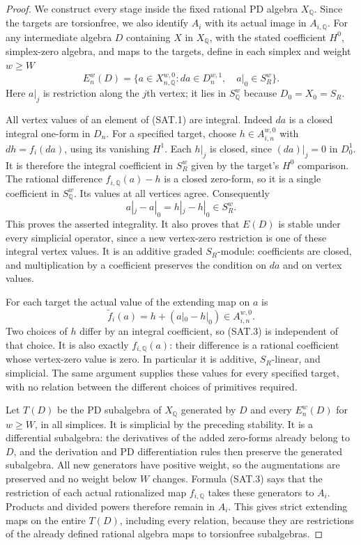 \begin{proof}
We construct every stage inside the fixed rational PD algebra
$X_{\mathbb Q}$. Since the targets are torsionfree, we also identify
$A_i$ with its actual image in $A_{i,\mathbb Q}$.
For any intermediate algebra $D$ containing $X$ in $X_{\mathbb Q}$,
with the stated coefficient $H^0$, simplex-zero algebra, and maps
to the targets, define in each simplex and weight $w\geq W$
\[
 E_n^w(D)=\{a\in X_{n,\mathbb Q}^{w,0}:
              da\in D_n^{w,1},\quad a|_0\in S_R^w\}.
 \tag{SAT.1}
\]
Here $a|_j$ is restriction along the $j$th vertex; it lies in
$S_{\mathbb Q}^w$ because $D_0=X_0=S_R$.

All vertex values of an element of (SAT.1) are integral.
Indeed $d a$ is a closed integral one-form in $D_n$.
For a specified target, choose $h\in A_{i,n}^{w,0}$ with
$dh=f_i(da)$, using its vanishing $H^1$.
Each $h|_j$ is closed, since $(da)|_j=0$ in $D_0^1$.
It is therefore the integral coefficient in $S_R^w$ given by
the target's $H^0$ comparison. The rational difference
$f_{i,\mathbb Q}(a)-h$ is a closed zero-form, so it is a
single coefficient in $S_{\mathbb Q}^w$. Its values at all
vertices agree. Consequently
\[
                  a|_j-a|_0=h|_j-h|_0\in S_R^w.
 \tag{SAT.2}
\]
This proves the asserted integrality. It also proves that
$E(D)$ is stable under every simplicial operator, since a
new vertex-zero restriction is one of these integral vertex
values. It is an additive graded $S_R$-module: coefficients
are closed, and multiplication by a coefficient preserves
the condition on $da$ and on vertex values.

For each target the actual value of the extending map on $a$ is
\[
             \widetilde f_i(a)=h+(a|_0-h|_0)\in A_{i,n}^{w,0}.
 \tag{SAT.3}
\]
Two choices of $h$ differ by an integral coefficient, so
(SAT.3) is independent of that choice. It is also exactly
$f_{i,\mathbb Q}(a)$: their difference is a rational coefficient
whose vertex-zero value is zero. In particular it is additive,
$S_R$-linear, and simplicial. The same argument supplies these
values for every specified target, with no relation between
the different choices of primitives required.

Let $T(D)$ be the PD subalgebra of $X_{\mathbb Q}$ generated by
$D$ and every $E_n^w(D)$ for $w\geq W$, in all simplices.
It is simplicial by the preceding stability. It is a differential
subalgebra: the derivatives of the added zero-forms already
belong to $D$, and the derivation and PD differentiation rules
then preserve the generated subalgebra. All new generators have
positive weight, so the augmentations are preserved and no weight
below $W$ changes. Formula (SAT.3) says that the restriction of
each actual rationalized map $f_{i,\mathbb Q}$ takes these generators
to $A_i$. Products and divided powers therefore remain in $A_i$.
This gives strict extending maps on the entire $T(D)$, including
every relation, because they are restrictions of the already
defined rational algebra maps to torsionfree subalgebras.


\end{proof}
